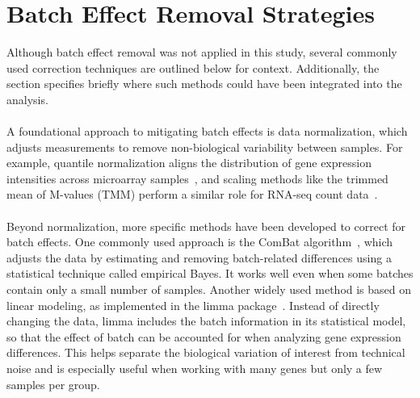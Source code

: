 \documentclass[12pt,a4paper]{report}
\begin{document}
\section{Batch Effect Removal Strategies}
\noindent
Although batch effect removal was not applied in this study, several commonly used correction techniques are outlined below for context. Additionally, the section specifies briefly where such methods could have been integrated into the analysis.\\
\\
A foundational approach to mitigating batch effects is data normalization, which adjusts measurements to remove non-biological variability between samples. For example, quantile normalization aligns the distribution of gene expression intensities across microarray samples~\cite{bolstad2003normalization}, and scaling methods like the trimmed mean of M-values (TMM) perform a similar role for RNA-seq count data~\cite{robinson2010tmm}.\\
\\
Beyond normalization, more specific methods have been developed to correct for batch effects. One commonly used approach is the ComBat algorithm~\cite{johnson2007combat}, which adjusts the data by estimating and removing batch-related differences using a statistical technique called empirical Bayes. It works well even when some batches contain only a small number of samples. Another widely used method is based on linear modeling, as implemented in the limma package~\cite{ritchie2015limma}. Instead of directly changing the data, limma includes the batch information in its statistical model, so that the effect of batch can be accounted for when analyzing gene expression differences. This helps separate the biological variation of interest from technical noise and is especially useful when working with many genes but only a few samples per group.\\
\\
\end{document}

